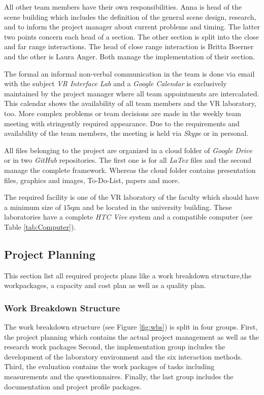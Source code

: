 All other team members have their own responsibilities. Anna is head of the scene building which includes the definition of the general scene design, research, and to inform the project manager about current problems and timing. The latter two points concern each head of a section. The other section is split into the close and far range interactions. The head of close range interaction is Britta Boerner and the other is Laura Anger. Both manage the implementation of their section.

The formal an informal non-verbal communication in the team is done via email with the subject \textit{VR Interface Lab} and a \textit{Google Calendar} is exclusively maintained by the project manager where all team appointments are intercalated. This calendar shows the availability of all team members and the VR laboratory, too. More complex problems or team decisions are made in the weekly team meeting with stringently required appearance. Due to the requirements and availability of the team members, the meeting is held via \textit{Skype} or in personal.

All files belonging to the project are organized in a cloud folder of \textit{Google Drive} or in two \textit{GitHub} repositories. The first one is for all \textit{LaTex} files and the second manage the complete framework. Whereas the cloud folder contains presentation files, graphics and images, To-Do-List, papers and more.

The required facility is one of the VR laboratory of the faculty which should have a minimum size of $15$qm and be located in the university building. These laboratories have a complete \textit{HTC Vive}
system and a compatible computer (see Table \ref{tab:Computer}).

\subsection{Project Planning} \label{sec:PMProjectPlanning}
This section list all required projects plans like a work breakdown structure,the workpackages, a capacity and  cost plan as well as a quality plan.
\subsubsection{Work Breakdown Structure}\label{sec:PMWBS}
The work breakdown structure (see Figure \ref{fig:wbs}) is split in four groups. First, the project planning which contains the actual project management as well as the research work packages Second, the implementation group includes the development of the laboratory environment and the six interaction methods. Third, the evaluation contains the work packages of  tasks including  measurements and the questionnaires. Finally, the last group includes the documentation and project profile packages.

